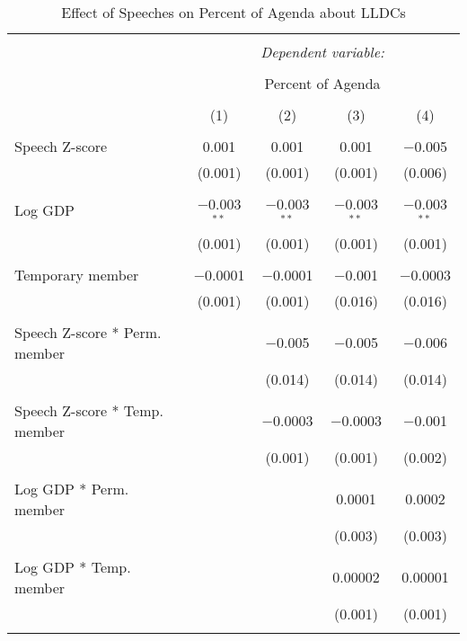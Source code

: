 
\begin{table}[!htbp] \centering 
  \caption{Effect of Speeches on Percent of Agenda about LLDCs} 
  \label{} 
\begin{tabular}{@{\extracolsep{5pt}}lcccc} 
\\[-1.8ex]\hline 
\hline \\[-1.8ex] 
 & \multicolumn{4}{c}{\textit{Dependent variable:}} \\ 
\cline{2-5} 
\\[-1.8ex] & \multicolumn{4}{c}{Percent of Agenda} \\ 
\\[-1.8ex] & (1) & (2) & (3) & (4)\\ 
\hline \\[-1.8ex] 
 Speech Z-score & 0.001 & 0.001 & 0.001 & $-$0.005 \\ 
  & (0.001) & (0.001) & (0.001) & (0.006) \\ 
  & & & & \\ 
 Log GDP & $-$0.003$^{**}$ & $-$0.003$^{**}$ & $-$0.003$^{**}$ & $-$0.003$^{**}$ \\ 
  & (0.001) & (0.001) & (0.001) & (0.001) \\ 
  & & & & \\ 
 Temporary member & $-$0.0001 & $-$0.0001 & $-$0.001 & $-$0.0003 \\ 
  & (0.001) & (0.001) & (0.016) & (0.016) \\ 
  & & & & \\ 
 Speech Z-score * Perm. member &  & $-$0.005 & $-$0.005 & $-$0.006 \\ 
  &  & (0.014) & (0.014) & (0.014) \\ 
  & & & & \\ 
 Speech Z-score * Temp. member &  & $-$0.0003 & $-$0.0003 & $-$0.001 \\ 
  &  & (0.001) & (0.001) & (0.002) \\ 
  & & & & \\ 
 Log GDP * Perm. member &  &  & 0.0001 & 0.0002 \\ 
  &  &  & (0.003) & (0.003) \\ 
  & & & & \\ 
 Log GDP * Temp. member &  &  & 0.00002 & 0.00001 \\ 
  &  &  & (0.001) & (0.001) \\ 
  & & & & \\ 

\end{tabular}
\end{table}

